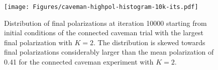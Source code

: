 \documentclass[11pt,letterpaper]{article}
\begin{document}
\begin{figure}[h!]
  \centering
    \texttt{[image: Figures/caveman-highpol-histogram-10k-its.pdf]}
  \caption{Distribution of final polarizations at iteration 10000
  starting from initial conditions
  of the connected caveman trial with the largest final polarization with $K=2$.
  The distribution is skewed towards final polarizations considerably larger
  than the mean polarization of 0.41 for the connected caveman experiment
  with $K=2$. 
  }
  \label{fig:highpol-histogram}
\end{figure}







\clearpage



\setlength{\bibleftmargin}{.125in}
\setlength{\bibindent}{-\bibleftmargin}


\end{document}
